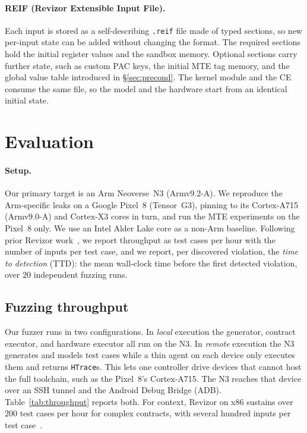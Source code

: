 \documentclass[letterpaper,twocolumn,10pt]{article}
\theoremstyle{definition}
\newif\ifdraft \draftfalse
\newcommand{\todo}[1]{\ifdraft{\textcolor{red}{[\textbf{TODO:} #1]}}\fi}
\begin{document}
\paragraph{REIF (Revizor Extensible Input File).}
Each input is stored as a self-describing \texttt{.reif} file made of typed sections, so new
per-input state can be added without changing the format. The required sections hold the
initial register values and the sandbox memory. Optional sections carry further state, such as
custom PAC keys, the initial MTE tag memory, and the global value table introduced in
\S\ref{sec:precond}. The kernel module and the CE consume the same file, so the model and the
hardware start from an identical initial state.

\section{Evaluation}
\label{sec:eval}

\paragraph{Setup.}
Our primary target is an Arm Neoverse~N3 (Armv9.2-A). We reproduce the Arm-specific leaks
on a Google Pixel~8 (Tensor~G3), pinning to its Cortex-A715 (Armv9.0-A) and Cortex-X3 cores in
turn, and run the MTE experiments on the Pixel~8 only. We use an Intel
Alder Lake core as a non-Arm baseline. Following prior Revizor
work~\cite{revizor,revizor_micro,hide_seek}, we report throughput as test cases
per hour with the number of inputs per test case, and we report, per discovered
violation, the \emph{time to detection} (TTD): the mean wall-clock time before the
first detected violation, over $20$ independent fuzzing runs.

\subsection{Fuzzing throughput}
\label{sec:eval-throughput}
Our fuzzer runs in two configurations. In \emph{local} execution the generator, contract
executor, and hardware executor all run on the N3. In \emph{remote} execution the N3 generates
and models test cases while a thin agent on each device only executes them and returns
\texttt{HTrace}s. This lets one controller drive devices that cannot host the full toolchain,
such as the Pixel~8's Cortex-A715. The N3 reaches that device over an SSH tunnel and the
Android Debug Bridge (ADB).
Table~\ref{tab:throughput} reports both.
For context, Revizor on x86 sustains over $200$ test cases per hour for complex
contracts, with several hundred inputs per test case~\cite{revizor,revizor_micro}.
\todo{measure and update: the x86 \textsc{Revizor} $200$ tc/hour figure is likely outdated.}
\end{document}
